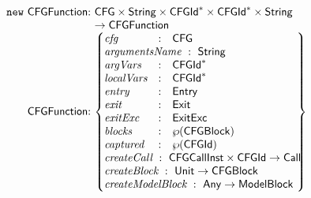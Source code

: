 \[
\begin{array}{@{~}r@{~}l@{}l@{~}l}
\new & \CFGFunction & : & \CFG \times \String \times \CFGId^{*} \times \CFGId^{*} \times \String\\
&&&\rightarrow \CFGFunction \\
& \CFGFunction & : &
\begin{Bmatrix*}[l]
\emph{cfg}  & : & \CFG \\
\lefteqn{\emph{argumentsName} \ : \ \String} \\
\emph{argVars} & : & \CFGId^{*} \\
\emph{localVars} & : & \CFGId^{*} \\
\emph{entry} & : & \Entry \\
\emph{exit} & : & \Exit \\
\emph{exitExc} & : & \ExitExc \\
\emph{blocks} & : & \powerset{\CFGBlock}
~~~~~~~~~~~~~~~~~\\
\emph{captured} & : & \powerset{\CFGId} \\
\lefteqn{\emph{createCall} \ : \ \CFGCallInst \times \CFGId \rightarrow \Call} \\
\lefteqn{\emph{createBlock} \ : \ \Unit \rightarrow \CFGBlock} \\
\lefteqn{\emph{createModelBlock} \ : \ \Any \rightarrow \ModelBlock} \\
\end{Bmatrix*}
\end{array}
\]

